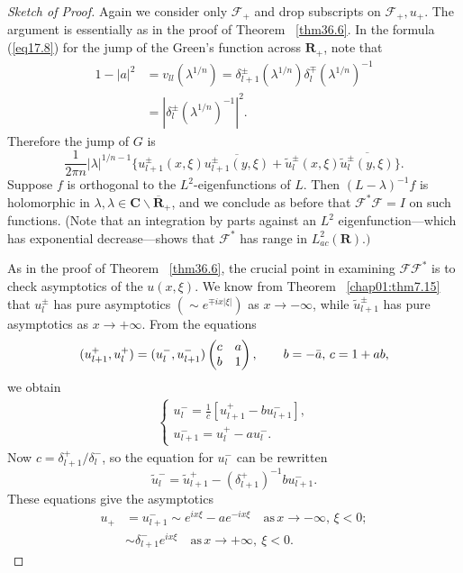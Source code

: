 \documentclass{surv-l}
\theoremstyle{plain}
\theoremstyle{definition}
\numberwithin{equation}{chapter}
\begin{document}
\begin{proof}[Sketch of Proof] Again we consider only $\mathscr{F}_{+}$ and drop subscripts on $\mathscr{F}_{+},u_{+}$. The argument is essentially as in the proof of Theorem ~\ref{thm36.6}. In the formula (\ref{eq17.8}) for the jump of the Green's function across $\mathbf{R}_{+}$, note that
\begin{align*}
1-|a|^{2}&=v_{ll}(\lambda^{1/n})=\delta_{l+1}^{\pm}(\lambda^{1/n})\delta_{l}^{\mp}(\lambda^{1/n})^{-1}\\
&=|\delta_{l}^{\pm}(\lambda^{1/n})^{-1}|^{2}.
\end{align*}
Therefore the jump of $G$ is
\begin{equation*}
\frac{1}{2\pi n}|\lambda|^{1/n-1}\{u_{l+1}^{\pm}(x,\xi)\overline{u_{l+1}^{\pm}(y, \xi)}+\tilde{u}_{l}^{\pm}(x,\xi)\overline{\tilde{u}_{l}^{\pm}(y,\xi)}\}.
\end{equation*}
Suppose $f$ is orthogonal to the $L^{2}$-eigenfunctions of $L$. Then $(L-\lambda)^{-1}f$ is holomorphic in $\lambda, \lambda\in\mathbf{C}\backslash \overline{\mathbf{R}}_{+}$, and we conclude as before that $\mathscr{F}^{*}\mathscr{F}=I$ on such functions. (Note that an integration by parts against an $L^{2}$ eigenfunction---which has exponential decrease---shows that $\mathscr{F}^{*}$ has range in $L_{ac}^{2}(\mathbf{R}).)$

As in the proof of Theorem ~\ref{thm36.6}, the crucial point in examining $\mathscr{F}\!\!\mathscr{F}^{*}$ is to check asymptotics of the $u(x, \xi)$. We know from Theorem ~\ref{chap01:thm7.15} that $u_{l}^{\pm}$ has pure asymptotics $(\sim e^{\mp ix|\xi|})$ as $ x\rightarrow-\infty$, while $\tilde{u}_{l+1}^{\pm}$ has pure asymptotics as $x\rightarrow +\infty$. From the equations
\begin{equation}\label{eq36.28}
(u_{l+1}^{+}, u_{l}^{+})=(u_{l}^{-}, u_{l+1}^{-})\left(\begin{array}{@{}ll@{}}
c & a\\
b & 1
\end{array}\right),\qquad b=-\bar{a},\,c=1+ab,
\end{equation}
we obtain
\begin{align}\label{eq36.29}
\left\{\begin{array}{l}
u_{l}^{-}=\frac{1}{c}[u_{l+1}^{+}-bu_{l+1}^{-}],\\
u_{l+1}^{-}=u_{l}^{+}-au_{l}^{-}.
\end{array}\right.
\end{align}
Now $c=\delta_{l+1}^{+}/\delta_{l}^{-}$, so the equation for $u_{l}^{-}$ can be rewritten
\begin{equation*}
\tilde{u}_{l}^{-}=\tilde{u}_{l+1}^{+}-(\delta_{l+1}^{+})^{-1}bu_{l+1}^{-}.
\end{equation*}
These equations give the asymptotics
\begin{align}\label{eq36.30}
u_{+}&=u_{l+1}^{-}\sim e^{ix\xi}-ae^{-ix\xi}\quad \mathrm{as}\,x\rightarrow-\infty,\,\xi<0;\\
&\sim\delta_{l+1}^{-}e^{ix\xi}\quad \mathrm{as}\,x\rightarrow +\infty,\ \xi<0.\nonumber
\end{align}


\end{proof}
\end{document}
